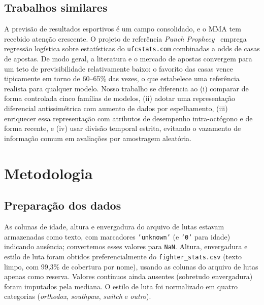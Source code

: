 \documentclass[10pt]{article}
\begin{document}
\subsection{Trabalhos similares}
A previsão de resultados esportivos é um campo consolidado, e o MMA tem
recebido atenção crescente. O projeto de referência \emph{Punch
Prophecy}~\cite{punchprophecy} emprega regressão logística sobre estatísticas do
\texttt{ufcstats.com} combinadas a odds de casas de apostas. De modo geral, a
literatura e o mercado de apostas convergem para um teto de previsibilidade
relativamente baixo: o favorito das casas vence tipicamente em torno de
60--65\% das vezes, o que estabelece uma referência realista para qualquer
modelo. Nosso trabalho se diferencia ao (i) comparar de forma controlada cinco
famílias de modelos, (ii) adotar uma representação diferencial antissimétrica
com aumento de dados por espelhamento, (iii) enriquecer essa representação com
atributos de desempenho intra-octógono e de forma recente, e (iv) usar divisão
temporal estrita, evitando o vazamento de informação comum em avaliações por
amostragem aleatória.

\section{Metodologia}

\subsection{Preparação dos dados}
As colunas de idade, altura e envergadura do arquivo de lutas estavam
armazenadas como texto, com marcadores \texttt{'unknown'} (e \texttt{'0'} para
idade) indicando ausência; convertemos esses valores para \texttt{NaN}. Altura,
envergadura e estilo de luta foram obtidos preferencialmente do
\texttt{fighter\_stats.csv} (texto limpo, com 99,3\% de cobertura por nome),
usando as colunas do arquivo de lutas apenas como reserva. Valores contínuos
ainda ausentes (sobretudo envergadura) foram imputados pela mediana. O estilo de
luta foi normalizado em quatro categorias (\emph{orthodox}, \emph{southpaw},
\emph{switch} e \emph{outro}).
\end{document}
